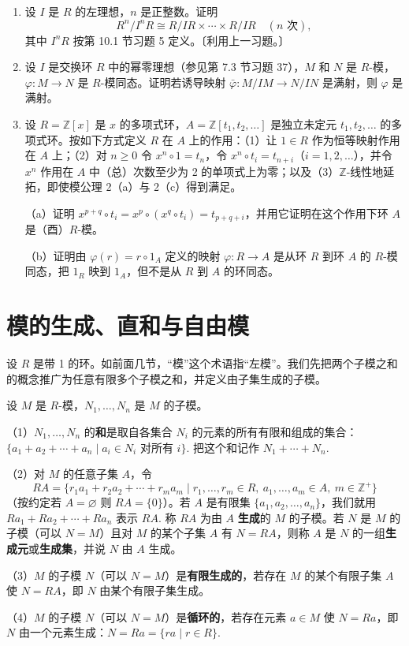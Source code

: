 \begin{enumerate}
\item 设 \(I\) 是 \(R\) 的左理想，\(n\) 是正整数。证明
\[
R^n/I^nR \cong R/IR \times \cdots \times R/IR \quad (n \text{ 次}),
\]
其中 \(I^nR\) 按第 10.1 节习题 5 定义。〔利用上一习题。〕

\item 设 \(I\) 是交换环 \(R\) 中的幂零理想（参见第 7.3 节习题 37），\(M\) 和 \(N\) 是 \(R\)-模，\(\varphi : M \to N\) 是 \(R\)-模同态。证明若诱导映射 \(\bar{\varphi} : M/IM \to N/IN\) 是满射，则 \(\varphi\) 是满射。

\item 设 \(R = \mathbb{Z}[x]\) 是 \(x\) 的多项式环，\(A = \mathbb{Z}[t_1, t_2, \ldots]\) 是独立未定元 \(t_1, t_2, \ldots\) 的多项式环。按如下方式定义 \(R\) 在 \(A\) 上的作用：（1）让 \(1 \in R\) 作为恒等映射作用在 \(A\) 上；（2）对 \(n \geq 0\) 令 \(x^n \circ 1 = t_n\)，令 \(x^n \circ t_i = t_{n+i}\)（\(i = 1, 2, \ldots\)），并令 \(x^n\) 作用在 \(A\) 中（总）次数至少为 2 的单项式上为零；以及（3）\(\mathbb{Z}\)-线性地延拓，即使模公理 2（a）与 2（c）得到满足。

（a）证明 \(x^{p+q} \circ t_i = x^p \circ (x^q \circ t_i) = t_{p+q+i}\)，并用它证明在这个作用下环 \(A\) 是（酉）\(R\)-模。

（b）证明由 \(\varphi(r) = r \circ 1_A\) 定义的映射 \(\varphi : R \to A\) 是从环 \(R\) 到环 \(A\) 的 \(R\)-模同态，把 \(1_R\) 映到 \(1_A\)，但不是从 \(R\) 到 \(A\) 的环同态。
\end{enumerate}

\section{模的生成、直和与自由模}

设 \(R\) 是带 1 的环。如前面几节，“模”这个术语指“左模”。我们先把两个子模之和的概念推广为任意有限多个子模之和，并定义由子集生成的子模。

\begin{definition}
设 \(M\) 是 \(R\)-模，\(N_1, \ldots, N_n\) 是 \(M\) 的子模。

（1）\(N_1, \ldots, N_n\) 的\textbf{和}是取自各集合 \(N_i\) 的元素的所有有限和组成的集合：\(\{a_1+a_2+\cdots+a_n \mid a_i \in N_i \text{ 对所有 } i\}\). 把这个和记作 \(N_1+\cdots+N_n\).

（2）对 \(M\) 的任意子集 \(A\)，令
\[
RA = \{r_1a_1+r_2a_2+\cdots+r_ma_m \mid r_1, \ldots, r_m \in R,\ a_1, \ldots, a_m \in A,\ m \in \mathbb{Z}^+\}
\]
（按约定若 \(A = \varnothing\) 则 \(RA = \{0\}\)）。若 \(A\) 是有限集 \(\{a_1, a_2, \ldots, a_n\}\)，我们就用 \(Ra_1+Ra_2+\cdots+Ra_n\) 表示 \(RA\). 称 \(RA\) 为由 \(A\) \textbf{生成}的 \(M\) 的子模。若 \(N\) 是 \(M\) 的子模（可以 \(N = M\)）且对 \(M\) 的某个子集 \(A\) 有 \(N = RA\)，则称 \(A\) 是 \(N\) 的一组\textbf{生成元}或\textbf{生成集}，并说 \(N\) 由 \(A\) 生成。

（3）\(M\) 的子模 \(N\)（可以 \(N = M\)）是\textbf{有限生成的}，若存在 \(M\) 的某个有限子集 \(A\) 使 \(N = RA\)，即 \(N\) 由某个有限子集生成。

（4）\(M\) 的子模 \(N\)（可以 \(N = M\)）是\textbf{循环的}，若存在元素 \(a \in M\) 使 \(N = Ra\)，即 \(N\) 由一个元素生成：\(N = Ra = \{ra \mid r \in R\}\).
\end{definition}

